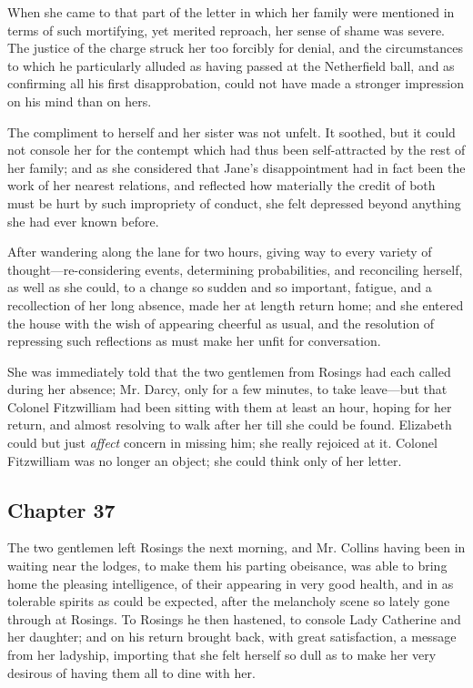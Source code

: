 When she came to that part of the letter in which her family were mentioned in terms of such mortifying, yet merited reproach, her sense of shame was severe. The justice of the charge struck her too forcibly for denial, and the circumstances to which he particularly alluded as having passed at the Netherfield ball, and as confirming all his first disapprobation, could not have made a stronger impression on his mind than on hers.

The compliment to herself and her sister was not unfelt. It soothed, but it could not console her for the contempt which had thus been self-attracted by the rest of her family; and as she considered that Jane's disappointment had in fact been the work of her nearest relations, and reflected how materially the credit of both must be hurt by such impropriety of conduct, she felt depressed beyond anything she had ever known before.

After wandering along the lane for two hours, giving way to every variety of thought---re-considering events, determining probabilities, and reconciling herself, as well as she could, to a change so sudden and so important, fatigue, and a recollection of her long absence, made her at length return home; and she entered the house with the wish of appearing cheerful as usual, and the resolution of repressing such reflections as must make her unfit for conversation.

She was immediately told that the two gentlemen from Rosings had each called during her absence; Mr. Darcy, only for a few minutes, to take leave---but that Colonel Fitzwilliam had been sitting with them at least an hour, hoping for her return, and almost resolving to walk after her till she could be found. Elizabeth could but just {\em affect} concern in missing him; she really rejoiced at it. Colonel Fitzwilliam was no longer an object; she could think only of her letter.

\subsection[chapter-37]{\useURL[url37][][][]\from[url37] Chapter 37}

The two gentlemen left Rosings the next morning, and Mr. Collins having been in waiting near the lodges, to make them his parting obeisance, was able to bring home the pleasing intelligence, of their appearing in very good health, and in as tolerable spirits as could be expected, after the melancholy scene so lately gone through at Rosings. To Rosings he then hastened, to console Lady Catherine and her daughter; and on his return brought back, with great satisfaction, a message from her ladyship, importing that she felt herself so dull as to make her very desirous of having them all to dine with her.

